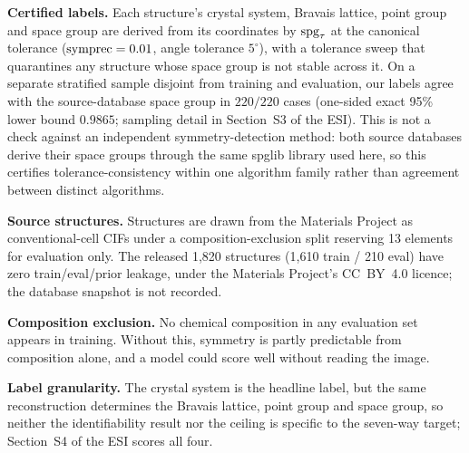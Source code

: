 \textbf{Certified labels.} Each structure's crystal system, Bravais lattice, point group and space group
are derived from its coordinates by $\mathrm{spg}_\tau$ at the canonical tolerance ($\mathrm{symprec}=0.01$, angle
tolerance $5^\circ$), with a tolerance sweep that quarantines any structure whose space group is not stable
across it. On a separate stratified sample disjoint from training and evaluation, our labels agree with the
source-database space group in $220/220$ cases (one-sided exact 95\% lower bound $0.9865$; sampling detail in
Section~S3 of the ESI\dag{}). This is not a check against an independent symmetry-detection method: both source
databases derive their space groups through the same spglib library used here, so this certifies
tolerance-consistency within one algorithm family rather than agreement between distinct algorithms.

\textbf{Source structures.} Structures are drawn from the Materials Project \citep{jain2013commentary} as conventional-cell CIFs under
a composition-exclusion split reserving 13 elements for evaluation only. The released 1,820 structures (1,610 train / 210 eval) have zero
train/eval/prior leakage, under the Materials Project's CC~BY~4.0 licence; the database snapshot is not
recorded.

\textbf{Composition exclusion.} No chemical composition in any evaluation set appears in training. Without
this, symmetry is partly predictable from composition alone, and a model could score well without reading the
image.

\textbf{Label granularity.} The crystal system is the headline label, but the same reconstruction determines
the Bravais lattice, point group and space group, so neither the identifiability result nor the ceiling is
specific to the seven-way target; Section~S4 of the ESI\dag{} scores all four.
